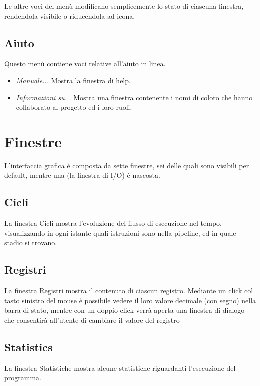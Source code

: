 \documentclass[letterpaper,10pt,english]{sphinxmanual}
\begin{document}
Le altre voci del menù modificano semplicemente lo stato di ciascuna
finestra, rendendola visibile o riducendola ad icona.


\subsection{Aiuto}
\label{user-interface:aiuto}
Questo menù contiene voci relative all'aiuto in linea.
\begin{itemize}
\item {} 
\emph{Manuale...} Mostra la finestra di help.

\item {} 
\emph{Informazioni su...} Mostra una finestra contenente i nomi di coloro
che hanno collaborato al progetto ed i loro ruoli.

\end{itemize}


\section{Finestre}
\label{user-interface:finestre}
L'interfaccia grafica è composta da sette finestre, sei delle quali sono
visibili per default, mentre una (la finestra di I/O) è nascosta.


\subsection{Cicli}
\label{user-interface:cicli}
La finestra Cicli mostra l'evoluzione del flusso di esecuzione nel tempo,
visualizzando in ogni istante quali istruzioni sono nella pipeline, ed in
quale stadio si trovano.


\subsection{Registri}
\label{user-interface:registri}
La finestra Registri mostra il contenuto di ciascun registro. Mediante un
click col tasto sinistro del mouse è possibile vedere il loro valore
decimale (con segno) nella barra di stato, mentre con un doppio click
verrà aperta una finestra di dialogo che consentirà all'utente di
cambiare il valore del registro


\subsection{Statistics}
\label{user-interface:statistics}
La finestra Statistiche mostra alcune statistiche riguardanti l'esecuzione del
programma.
\end{document}
